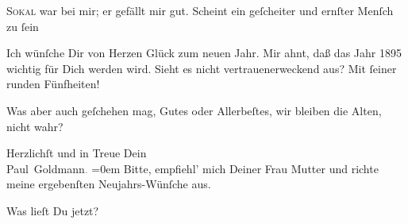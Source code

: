 \pstart
           {\pb}\textsc{Sokal} war bei mir; er gefällt mir gut. Scheint ein geſcheiter und ernſter Menſch zu
                  ſein{\dotsfour}\pend
           
\pstart
           Ich wünſche Dir von Herzen Glück zum neuen Jahr. Mir ahnt, daß das Jahr
                  1895 wichtig für Dich werden wird. Sieht es nicht vertrauenerweckend
               aus? Mit ſeiner runden Fünfheiten!\pend
           
\pstart
           Was aber auch geſchehen mag, Gutes oder Allerbeſtes, wir bleiben die Alten, nicht
               wahr?\pend
           
\pstart
           Herzlichſt und in Treue Dein{\\[\baselineskip]}\spacefill\mbox{Paul Goldmann\textcolor{gray}{.}}\pend
           \leftskip=0em{}
\pstart
           \noindent{}{\pb}Bitte, empfiehl’ mich Deiner Frau Mutter und richte \label{T_L02630-1v}\label{T_L02630-1} meine ergebenſten Neujahrs-Wünſche aus.\pend
           
\pstart
           Was lieſt Du jetzt?\pend
           \endnumbering{}  
      